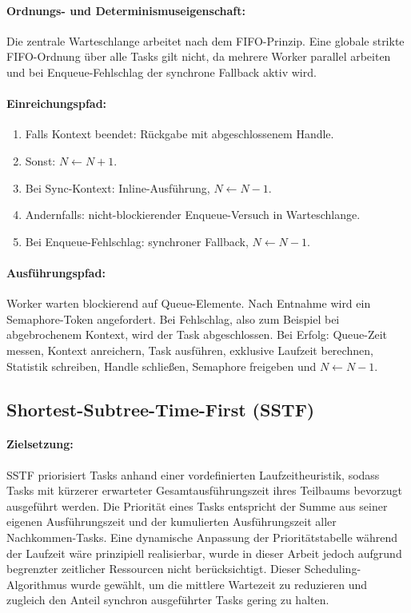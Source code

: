 \begin{sloppypar}
\paragraph{Ordnungs- und Determinismuseigenschaft:}
Die zentrale Warteschlange arbeitet nach dem \acs{FIFO}-Prinzip.
Eine globale strikte \acs{FIFO}-Ordnung über alle Tasks gilt nicht, da
mehrere Worker parallel arbeiten und
bei Enqueue-Fehlschlag der synchrone Fallback aktiv wird.

\paragraph{Einreichungspfad:}
\begin{enumerate}
\item Falls Kontext beendet: Rückgabe mit abgeschlossenem Handle.
\item Sonst: $N \gets N+1$.
\item Bei Sync-Kontext: Inline-Ausführung, $N \gets N-1$.
\item Andernfalls: nicht-blockierender Enqueue-Versuch in Warteschlange.
\item Bei Enqueue-Fehlschlag: synchroner Fallback, $N \gets N-1$.
\end{enumerate}

\paragraph{Ausführungspfad:}
Worker warten blockierend auf Queue-Elemente. Nach Entnahme wird ein Semaphore-Token angefordert. 
Bei Fehlschlag, also zum Beispiel bei abgebrochenem Kontext, wird der Task abgeschlossen.
Bei Erfolg: Queue-Zeit messen, Kontext anreichern, Task ausführen, exklusive Laufzeit berechnen, Statistik schreiben, Handle schließen, Semaphore freigeben und $N \gets N-1$.


\subsection{Shortest-Subtree-Time-First (\acs{SSTF})}

\paragraph{Zielsetzung:}
\acs{SSTF} priorisiert Tasks anhand einer vordefinierten Laufzeitheuristik, sodass Tasks mit kürzerer erwarteter Gesamtausführungszeit ihres Teilbaums bevorzugt ausgeführt werden.
Die Priorität eines Tasks entspricht der Summe aus seiner eigenen Ausführungszeit 
und der kumulierten Ausführungszeit aller Nachkommen-Tasks.
Eine dynamische Anpassung der Prioritätstabelle während der Laufzeit wäre prinzipiell realisierbar, 
wurde in dieser Arbeit jedoch aufgrund begrenzter zeitlicher Ressourcen nicht berücksichtigt.
Dieser Scheduling-Algorithmus wurde gewählt, 
um die mittlere Wartezeit zu reduzieren und zugleich den Anteil synchron ausgeführter Tasks gering zu halten.


\end{sloppypar}
